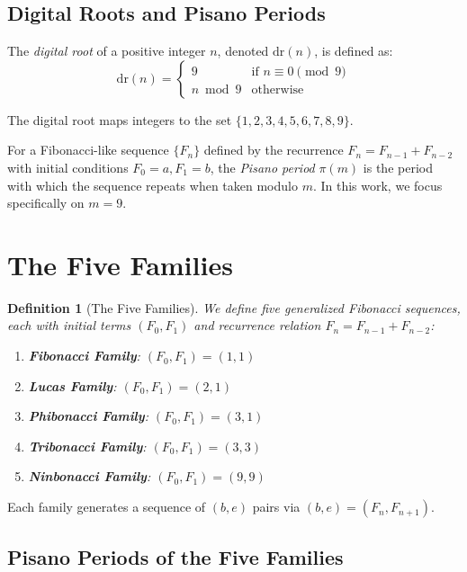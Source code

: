 \documentclass[12pt]{article}
\newtheorem{definition}{Definition}
\begin{document}
\subsection{Digital Roots and Pisano Periods}

The \emph{digital root} of a positive integer $n$, denoted $\text{dr}(n)$, is defined as:
\begin{equation}
\text{dr}(n) = \begin{cases}
9 & \text{if } n \equiv 0 \pmod{9} \\
n \bmod 9 & \text{otherwise}
\end{cases}
\end{equation}

The digital root maps integers to the set $\{1, 2, 3, 4, 5, 6, 7, 8, 9\}$.

For a Fibonacci-like sequence $\{F_n\}$ defined by the recurrence $F_n = F_{n-1} + F_{n-2}$ with initial conditions $F_0 = a, F_1 = b$, the \emph{Pisano period} $\pi(m)$ is the period with which the sequence repeats when taken modulo $m$. In this work, we focus specifically on $m = 9$.

\section{The Five Families}

\begin{definition}[The Five Families]
We define five generalized Fibonacci sequences, each with initial terms $(F_0, F_1)$ and recurrence relation $F_n = F_{n-1} + F_{n-2}$:

\begin{enumerate}
\item \textbf{Fibonacci Family}: $(F_0, F_1) = (1, 1)$
\item \textbf{Lucas Family}: $(F_0, F_1) = (2, 1)$
\item \textbf{Phibonacci Family}: $(F_0, F_1) = (3, 1)$
\item \textbf{Tribonacci Family}: $(F_0, F_1) = (3, 3)$
\item \textbf{Ninbonacci Family}: $(F_0, F_1) = (9, 9)$
\end{enumerate}
\end{definition}

Each family generates a sequence of $(b, e)$ pairs via $(b, e) = (F_n, F_{n+1})$.

\subsection{Pisano Periods of the Five Families}
\end{document}
